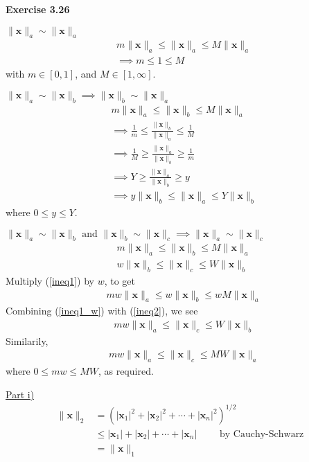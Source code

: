 \documentclass[letterpaper,12pt]{article}
\newcommand{\vect}[1]{\mathbf{#1}}
\begin{document}
\textbf{Exercise 3.26}

\underline{$\| \vect{x} \|_a \sim \| \vect{x} \|_a$}
\begin{align*}
  & m \| \vect{x} \|_a \leq \|\vect{x}\|_a \leq M \| \vect{x} \|_a
  \\
  & \implies m \leq 1 \leq M
\end{align*}
with $m \in [0, 1]$, and $M \in [1, \infty]$.

\underline{$ \| \vect{x} \|_a \sim \| \vect{x} \|_b \implies \| \vect{x} \|_b \sim \| \vect{x} \|_a$}
\begin{align*}
  & m \| \vect{x} \|_a \leq \|\vect{x}\|_b \leq M \| \vect{x} \|_a
  \\
  & \implies \frac{1}{m} \leq \frac{\|\vect{x}\|_b}{\| \vect{x} \|_a } \leq \frac{1}{M} \\
  & \implies \frac{1}{M} \geq \frac{\|\vect{x}\|_a}{\| \vect{x} \|_b } \geq \frac{1}{m} \\
  & \implies Y \geq \frac{\|\vect{x}\|_a}{\| \vect{x} \|_b } \geq y \\
  & \implies y \| \vect{x} \|_b  \leq \|\vect{x}\|_a \leq Y \| \vect{x} \|_b 
\end{align*}
where $0 \leq y \leq Y$.

\underline{$ \| \vect{x} \|_a \sim \| \vect{x} \|_b \text{ and } \| \vect{x} \|_b \sim \| \vect{x} \|_c  \implies \| \vect{x} \|_a \sim \| \vect{x} \|_c$}
\begin{align}
  \label{ineq1}
  & m \| \vect{x} \|_a \leq \|\vect{x}\|_b \leq M \| \vect{x} \|_a
\\
  \label{ineq2}
  & w \| \vect{x} \|_b \leq \|\vect{x}\|_c \leq W \| \vect{x} \|_b
\end{align}
Multiply (\ref{ineq1}) by $w$, to get
\begin{align}
  \label{ineq1_w}
  & mw \| \vect{x} \|_a \leq w\|\vect{x}\|_b \leq wM \| \vect{x} \|_a
\end{align}
Combining (\ref{ineq1_w}) with (\ref{ineq2}), we see
\begin{align*}
  & mw \| \vect{x} \|_a \leq \|\vect{x}\|_c \leq W \| \vect{x} \|_b
\end{align*}
Similarily,
\begin{align*}
  & mw \| \vect{x} \|_a \leq \|\vect{x}\|_c \leq MW \| \vect{x} \|_a
\end{align*}
where $0 \leq mw \leq MW$, as required.

\underline{Part i)}
\begin{align*}
  \| \vect{x} \|_2 
  &= (|\vect{x}_1|^2 + |\vect{x}_2|^2 + \cdots + |\vect{x}_n|^2)^{1/2} \\
  & \leq |\vect{x}_1| + |\vect{x}_2| + \cdots + |\vect{x}_n| \quad \quad \text{ by Cauchy-Schwarz} \\
  &= \| \vect{x} \|_1
\end{align*}
\end{document}
